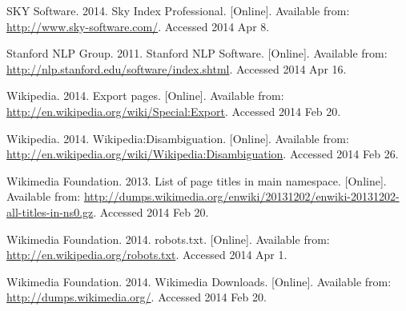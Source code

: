 \begin{thebibliography}{99}
SKY Software. 2014. Sky Index Professional. [Online]. Available from: \url{http://www.sky-software.com/}. Accessed 2014 Apr 8.

Stanford NLP Group. 2011. Stanford NLP Software. [Online]. Available from: \url{http://nlp.stanford.edu/software/index.shtml}. Accessed 2014 Apr 16.

Wikipedia. 2014. Export pages. [Online]. Available from: \url{http://en.wikipedia.org/wiki/Special:Export}. Accessed 2014 Feb 20.

Wikipedia. 2014. Wikipedia:Disambiguation. [Online]. Available from: \url{http://en.wikipedia.org/wiki/Wikipedia:Disambiguation}. Accessed 2014 Feb 26.

Wikimedia Foundation. 2013. List of page titles in main namespace. [Online]. Available from: \url{http://dumps.wikimedia.org/enwiki/20131202/enwiki-20131202-all-titles-in-ns0.gz}. Accessed 2014 Feb 20.

Wikimedia Foundation. 2014. robots.txt. [Online]. Available from: \url{http://en.wikipedia.org/robots.txt}. Accessed 2014 Apr 1.

Wikimedia Foundation. 2014. Wikimedia Downloads. [Online]. Available from: \url{http://dumps.wikimedia.org/}. Accessed 2014 Feb 20.

\end{thebibliography}